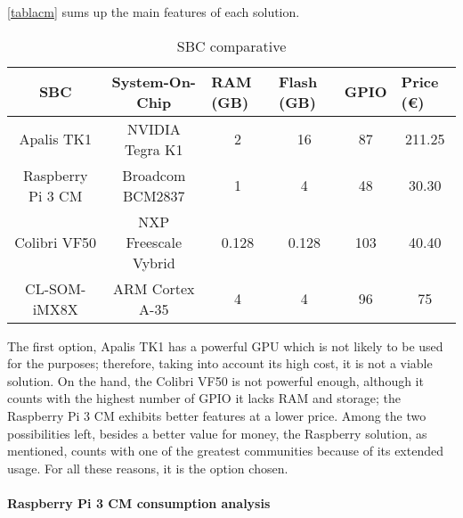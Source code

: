 \autoref{tablacm} sums up the main features of each solution.
\begin{table}[H]
\centering
\begin{tabular}{@{}cccccc@{}}
\toprule
\textbf{SBC}      & \textbf{System-On-Chip} & \multicolumn{1}{l}{\textbf{RAM (GB)}} & \multicolumn{1}{l}{\textbf{Flash (GB)}} & \multicolumn{1}{l}{\textbf{GPIO}} & \multicolumn{1}{l}{\textbf{Price (€)}} \\ \midrule
Apalis TK1        & NVIDIA Tegra K1         & 2                                     & 16                                      & 87                                & 211.25                                 \\ \midrule
Raspberry Pi 3 CM & Broadcom BCM2837        & 1                                     & 4                                       & 48                                & 30.30                                  \\ \midrule
Colibri VF50      & NXP Freescale Vybrid    & 0.128                                 & 0.128                                   & 103                               & 40.40                                  \\ \midrule
CL-SOM-iMX8X      & ARM Cortex A-35         & 4                                     & 4                                       & 96                                & 75                                     \\ \bottomrule
\end{tabular}
\caption{SBC comparative}
\label{tablacm}
\end{table}

The first option, Apalis TK1 has a powerful GPU which is not likely to be used for the  purposes; therefore, taking into account its high cost, it is not a viable solution. On the hand, the Colibri VF50 is not powerful enough, although it counts with the highest number of \acrshort{GPIO} it lacks RAM and storage; the Raspberry Pi 3 CM exhibits better features at a lower price. Among the two possibilities left, besides a better value for money, the Raspberry solution, as mentioned, counts with one of the greatest communities because of its extended usage. For all these reasons, it is the option chosen.

\paragraph{Raspberry Pi 3 CM consumption analysis} \label{rpipower}

